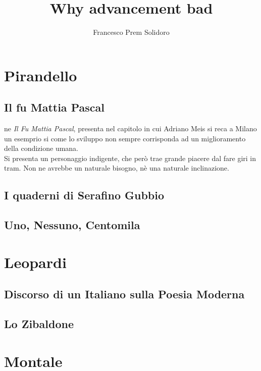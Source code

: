 \documentclass{article}
\title{Why advancement bad}
\author{Francesco Prem Solidoro}
\begin{document}
\maketitle
\section{Pirandello} %
\label{sec:Pirandello}
\subsection{Il fu Mattia Pascal} %
\label{sub:Il fu Mattia Pascal}
ne \textit{Il Fu Mattia Pascal}, \textcite{il_fu_mattia_pascal} presenta nel capitolo in cui Adriano Meis si reca a Milano un esemprio si come lo sviluppo non sempre corrisponda ad un miglioramento della condizione umana.\\
Si presenta un personaggio indigente, che però trae grande piacere dal fare giri in tram. Non ne avrebbe un naturale bisogno, nè una naturale inclinazione.
\subsection{I quaderni di Serafino Gubbio} %
\label{sub:I quaderni di Serafino Gubbio}
\subsection{Uno, Nessuno, Centomila} %
\label{sub:Uno Nessuno Centomila}


\section{Leopardi} %
\label{sec:Leopardi}
\subsection{Discorso di un Italiano sulla Poesia Moderna} %
\label{sub:Discorso di un Italiano sulla Poesia Moderna}
\subsection{Lo Zibaldone} %
\label{sub:Lo Zibaldone}


\section{Montale} %
\label{sec:Montale}
\end{document}
